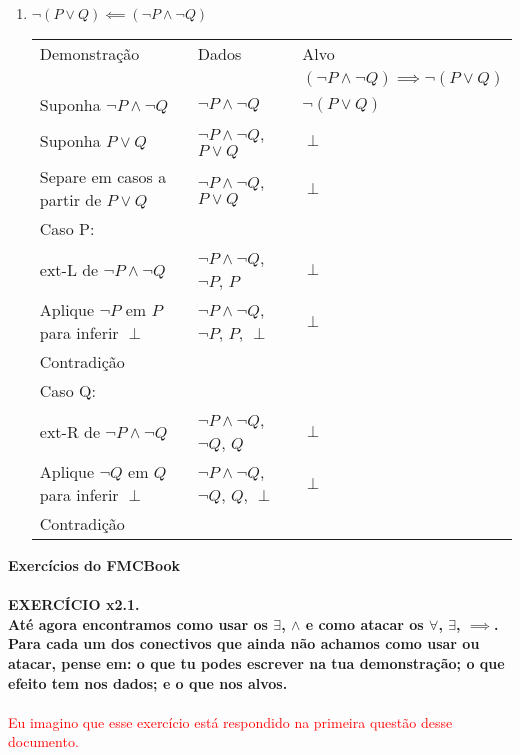 \documentclass[a4paper, 12pt]{article}
\begin{document}
\begin{enumerate}
\begin{enumerate}[1.]
        \item $\neg (P \lor Q) \impliedby (\neg P \land \neg Q)$
        \begin{table}[h!]
            \centering
            \begin{tabular}{|p{4cm} | p{4cm} | p{4cm} |}
            \rowcolor{gray!50}
            Demonstração & Dados & Alvo \\
            & & $(\neg P \land \neg Q) \implies \neg (P \lor Q)$\\
            Suponha $\neg P \land \neg Q$ & $\neg P \land \neg Q$ & $\neg(P \lor Q)$ \\
            Suponha $P \lor Q$ & $\neg P \land \neg Q$, $P \lor Q$ & $\perp$ \\
            Separe em casos a partir de $P \lor Q$ & $\neg P \land \neg Q$, $P \lor Q$ & $\perp$ \\
            \hline
            Caso P: & & \\
            ext-L de $\neg P \land \neg Q$ & $\neg P \land \neg Q$, $\neg P$, $P$ & $\perp$ \\
            Aplique $\neg P$ em $P$ para inferir $\perp$ & $\neg P \land \neg Q$, $\neg P$, $P$, $\perp$ & $\perp$ \\
            Contradição & & \\
            \hline
            Caso Q: & & \\
            ext-R de $\neg P \land \neg Q$ & $\neg P \land \neg Q$, $\neg Q$, $Q$ & $\perp$ \\
            Aplique $\neg Q$ em $Q$ para inferir $\perp$ & $\neg P \land \neg Q$, $\neg Q$, $Q$, $\perp$ & $\perp$ \\
            Contradição & & \\
            \hline
            \end{tabular}
        \end{table}

    \end{enumerate}
\end{enumerate}

\newpage
\noindent\textbf{Exercícios do FMCBook} \\ \\

\noindent\textbf{EXERCÍCIO x2.1. \\
Até agora encontramos como usar os $\exists$, $\land$ e como atacar os $\forall$, $\exists$, $\implies$. Para cada um dos
conectivos que ainda não achamos como usar ou atacar, pense em: o que tu podes
escrever na tua demonstração; o que efeito tem nos dados; e o que nos alvos.} \\ \\
\textcolor{red}{Eu imagino que esse exercício está respondido na primeira questão desse documento.} \\ \\
\end{document}

